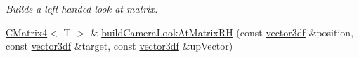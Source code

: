 \begin{DoxyCompactItemize}
\begin{DoxyCompactList}\small\item\em Builds a left-\/handed look-\/at matrix. \end{DoxyCompactList}\item 
\hyperlink{classirr_1_1core_1_1CMatrix4}{C\+Matrix4}$<$ T $>$ \& \hyperlink{classirr_1_1core_1_1CMatrix4_a62ebd6002a5018c1096ac368f6be271a}{build\+Camera\+Look\+At\+Matrix\+RH} (const \hyperlink{namespaceirr_1_1core_a06f169d08b5c429f5575acb7edbad811}{vector3df} \&position, const \hyperlink{namespaceirr_1_1core_a06f169d08b5c429f5575acb7edbad811}{vector3df} \&target, const \hyperlink{namespaceirr_1_1core_a06f169d08b5c429f5575acb7edbad811}{vector3df} \&up\+Vector)\hypertarget{classirr_1_1core_1_1CMatrix4_a62ebd6002a5018c1096ac368f6be271a}{}\label{classirr_1_1core_1_1CMatrix4_a62ebd6002a5018c1096ac368f6be271a}


\end{DoxyCompactItemize}
